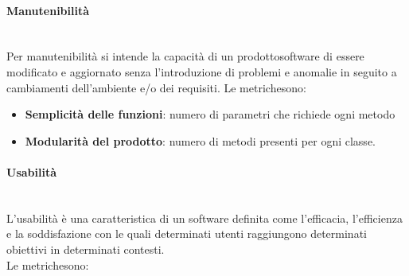 	\paragraph{Manutenibilità} \mbox{}\\[1mm]
	Per manutenibilità si intende la capacità di un prodotto\glosp software di essere modificato e aggiornato senza l'introduzione di problemi e anomalie in seguito a cambiamenti dell'ambiente e/o dei requisiti.
	Le metriche\glosp sono:
	\begin{itemize}
		\item \textbf{Semplicità delle funzioni}: numero di parametri che richiede ogni metodo
		\item \textbf{Modularità del prodotto}\glo: numero di metodi presenti per ogni classe.
	\end{itemize}
	\paragraph{Usabilità} \mbox{}\\[1mm]
	L'usabilità è una caratteristica di un software definita come l'efficacia, l'efficienza e la soddisfazione con le quali determinati utenti raggiungono determinati obiettivi in determinati contesti.\\
	Le metriche\glosp sono:
